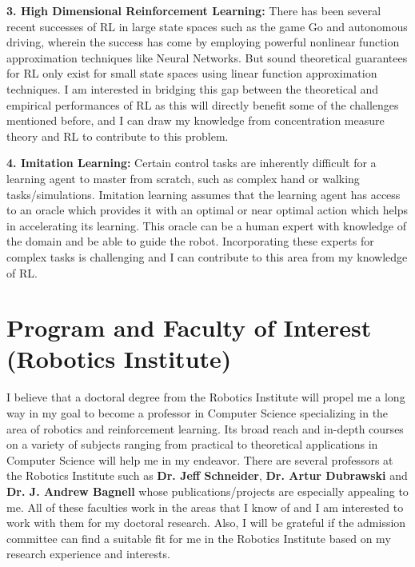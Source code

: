\documentclass{article}
\begin{document}
\textbf{3. High Dimensional Reinforcement Learning:} There has been several recent successes of RL in large state spaces such as the game Go and autonomous driving, wherein the success has come by employing powerful nonlinear function approximation techniques like Neural Networks. But sound theoretical guarantees for RL only exist
for small state spaces using linear function approximation techniques. I am interested in bridging this gap between the theoretical and empirical performances of RL as this will directly benefit some of the challenges mentioned before, and I can draw my knowledge from concentration measure theory and RL to contribute to this problem.


\textbf{4. Imitation Learning:} Certain control tasks are inherently difficult for a learning agent to master from scratch, such as complex hand or walking tasks/simulations. Imitation learning assumes that the learning agent has access to an oracle which provides it with an optimal or near optimal action which helps in accelerating its learning. This oracle can  be a human expert with knowledge of the domain and be able to guide the robot. Incorporating these experts for complex tasks is challenging and I can contribute to this area from my knowledge of RL.


\vspace*{-2em}
\section{Program and Faculty of Interest (Robotics Institute)}
\vspace*{-1em}

I believe that a doctoral degree from the Robotics Institute will propel me a long way in my goal to become a professor in Computer Science specializing in the area of robotics and reinforcement learning. Its broad reach and in-depth courses on a  variety of subjects ranging from practical to theoretical applications in Computer Science will help me in my endeavor. There are several professors at the Robotics Institute such as \textbf{Dr. Jeff Schneider}, \textbf{Dr. Artur Dubrawski} and \textbf{Dr. J. Andrew Bagnell} whose publications/projects are especially appealing to me. All of these faculties work in the areas that I know of and I am interested to work with them for my doctoral research. Also, I will be grateful if the admission committee can find a suitable fit for me in the  Robotics Institute based on my research experience and interests.
\end{document}
